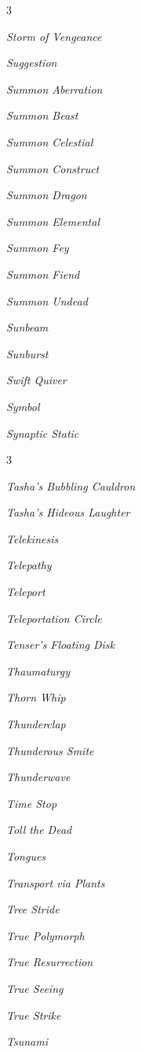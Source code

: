 \documentclass[10pt,a4paper,twoside,bg=print,twocolumn,openany,nodeprecatedcode]{dndbook}
\begin{document}
\begin{description}
\begin{multicols}{3}
\item \textit{Storm of Vengeance}
\item \textit{Suggestion}
\item \textit{Summon Aberration}
\item \textit{Summon Beast}
\item \textit{Summon Celestial}
\item \textit{Summon Construct}
\item \textit{Summon Dragon}
\item \textit{Summon Elemental}
\item \textit{Summon Fey}
\item \textit{Summon Fiend}
\item \textit{Summon Undead}
\item \textit{Sunbeam}
\item \textit{Sunburst}
\item \textit{Swift Quiver}
\item \textit{Symbol}
\item \textit{Synaptic Static}
\end{multicols}

\end{description}


\begin{description}
\begin{multicols}{3}
\item \textit{Tasha's Bubbling Cauldron}
\item \textit{Tasha's Hideous Laughter}
\item \textit{Telekinesis}
\item \textit{Telepathy}
\item \textit{Teleport}
\item \textit{Teleportation Circle}
\item \textit{Tenser's Floating Disk}
\item \textit{Thaumaturgy}
\item \textit{Thorn Whip}
\item \textit{Thunderclap}
\item \textit{Thunderous Smite}
\item \textit{Thunderwave}
\item \textit{Time Stop}
\item \textit{Toll the Dead}
\item \textit{Tongues}
\item \textit{Transport via Plants}
\item \textit{Tree Stride}
\item \textit{True Polymorph}
\item \textit{True Resurrection}
\item \textit{True Seeing}
\item \textit{True Strike}
\item \textit{Tsunami}
\end{multicols}

\end{description}
\end{document}
